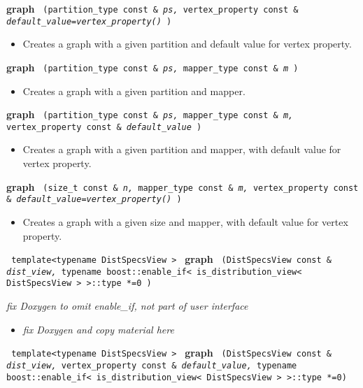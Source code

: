 \noindent
\textbf{graph}%
\texttt{%
(partition\_type const \&
\textit{ps,}%
vertex\_property const \&
\textit{default\_value=vertex\_property()}%
)
}

\begin{itemize}
\item
Creates a graph with a given partition and default value for vertex property.
\end{itemize}
 
\noindent
\textbf{graph}%
\texttt{%
(partition\_type const \&
\textit{ps,}%
mapper\_type const \&
\textit{m}%
)
}

\begin{itemize}
\item
Creates a graph with a given partition and mapper.
\end{itemize}
 
\noindent
\textbf{graph}%
\texttt{%
(partition\_type const \&
\textit{ps,}%
mapper\_type const \&
\textit{m,}%
vertex\_property const \&
\textit{default\_value}%
)
}

\begin{itemize}
\item
Creates a graph with a given partition and mapper, with default value for vertex property.
\end{itemize}
 
\noindent
\textbf{graph}%
\texttt{%
(size\_t const \&
\textit{n,}%
mapper\_type const \&
\textit{m,}%
vertex\_property const \&
\textit{default\_value=vertex\_property()}%
)
}

\begin{itemize}
\item
Creates a graph with a given size and mapper, with default value for vertex property. 
\end{itemize}
 
\noindent
\texttt{%
template<typename DistSpecsView >
}
\newline
\textbf{graph}%
\texttt{%
(DistSpecsView const \&
\textit{dist\_view,}%
typename boost::enable\_if< is\_distribution\_view< DistSpecsView > >::type *=0
)
}

\vspace{0.4cm} \emph{fix Doxygen to omit enable\_if, not part of user interface}

\begin{itemize}
\item
\emph{fix Doxygen and copy material here}
\end{itemize}
 
\noindent
\texttt{%
template<typename DistSpecsView >
}
\newline
\textbf{graph}%
\texttt{%
(DistSpecsView const \&
\textit{dist\_view,}%
vertex\_property const \&
\textit{default\_value,}%
typename boost::enable\_if< is\_distribution\_view< DistSpecsView > >::type *=0)
}

